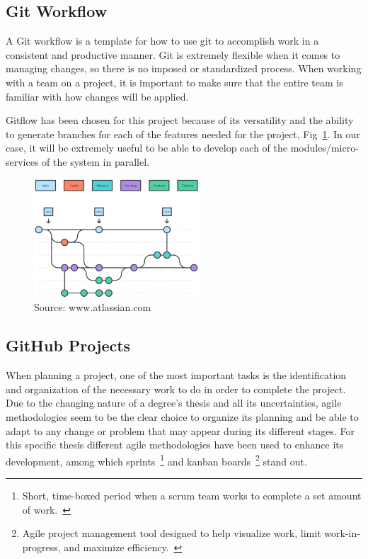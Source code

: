 \subsection{Git Workflow}

A Git workflow is a template for how to use git to accomplish work in a consistent and productive manner. Git is extremely flexible when it comes to managing changes, so there is no imposed or standardized process. When working with a team on a project, it is important to make sure that the entire team is familiar with how changes will be applied. 

Gitflow has been chosen for this project because of its versatility and the ability to generate branches for each of the features needed for the project, Fig~\ref{fig:gitflow-example}. In our case, it will be extremely useful to be able to develop each of the modules/micro-services of the system in parallel.

\begin{figure}[H]
    \centering
    \includegraphics[width=0.55\textwidth]{figures/gitflow.png}
    \caption{Source: www.atlassian.com~\cite{gitflow}}
    \label{fig:gitflow-example}
\end{figure}

\subsection{GitHub Projects}

When planning a project, one of the most important tasks is the identification and organization of the necessary work to do in order to complete the project. Due to the changing nature of a degree's thesis and all its uncertainties, agile methodologies seem to be the clear choice to organize its planning and be able to adapt to any change or problem that may appear during its different stages. For this specific thesis different agile methodologies have been used to enhance its development, among which sprints~\footnote{Short, time-boxed period when a scrum team works to complete a set amount of work.~\cite{sprintsDef}} and kanban boards~\footnote{Agile project management tool designed to help visualize work, limit work-in-progress, and maximize efficiency.~\cite{kanbanDef}} stand out.

